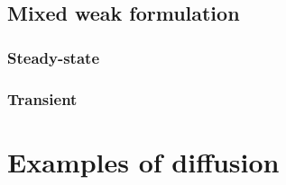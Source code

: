 \documentclass{article}
\theoremstyle{definition}
\begin{document}
\subsection{Mixed weak formulation}
\subsubsection{Steady-state}


\subsubsection{Transient}




\section{Examples of diffusion}
\label{section:examples_of_transport_phenomena}
\end{document}

